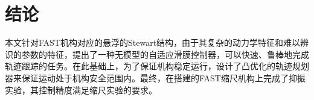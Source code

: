 \section{结论}

本文针对FAST机构对应的悬浮的Stewart结构，由于其复杂的动力学特征和难以辨识的参数的特征，提出了一种无模型的自适应滑膜控制器，可以快速、鲁棒地完成轨迹跟踪的任务。在此基础上，为了保证机构稳定运行，设计了凸优化的轨迹规划器来保证运动处于机构安全范围内。最终，在搭建的FAST缩尺机构上完成了抑振实验，其控制精度满足缩尺实验的要求。
